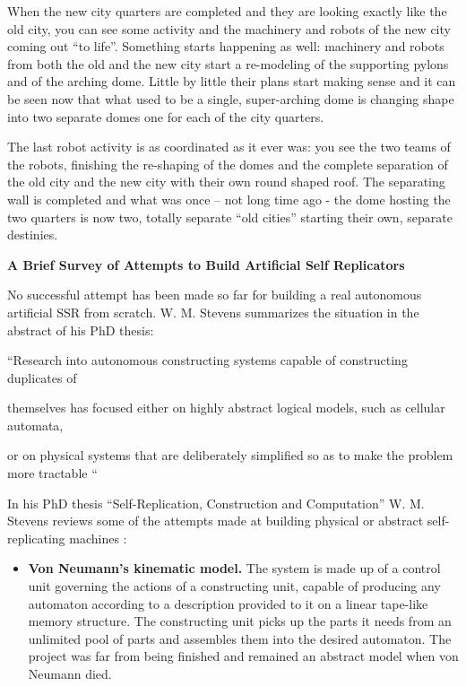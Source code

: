 \bigskip

When the new city quarters are completed and they are looking exactly
like the old city, you can see some activity and the machinery and
robots of the new city coming out “to life”. Something starts happening
as well: machinery and robots from both the old and the new city start
a re-modeling of the supporting pylons and of the arching dome. Little
by little their plans start making sense and it can be seen now that
what used to be a single, super-arching dome is changing shape into two
separate domes one for each of the city quarters.


\bigskip

The last robot activity is as coordinated as it ever was: you see the
two teams of the robots, finishing the re-shaping of the domes and the
complete separation of the old city and the new city with their own
round shaped roof. The separating wall is completed and what was once –
not long time ago - the dome hosting the two quarters is now two,
totally separate “old cities” starting their own, separate destinies.


\bigskip

{\bfseries
\hypertarget{RefHeading3152306210128}{}A Brief Survey of Attempts to
Build Artificial Self Replicators}

No successful attempt has been made so far for building a real
autonomous artificial SSR from scratch. W. M. Stevens summarizes the
situation in the abstract of his PhD thesis:


\bigskip

“Research into autonomous constructing systems capable of constructing
duplicates of

themselves has focused either on highly abstract logical models, such as
cellular automata,

or on physical systems that are deliberately simplified so as to make
the problem more tractable “


\bigskip

In his PhD thesis “Self-Replication, Construction and Computation” W. M.
Stevens reviews some of the attempts made at building physical or
abstract self-replicating machines :


\bigskip

\begin{itemize}
\item \textbf{Von Neumann’s kinematic model.} The system is made up of a
control unit governing the actions of a constructing unit, capable of
producing any automaton according to a description provided to it on a
linear tape-like memory structure. The constructing unit picks up the
parts it needs from an unlimited pool of parts and assembles them into
the desired automaton. The project was far from being finished and
remained an abstract model when von Neumann died.
\end{itemize}

